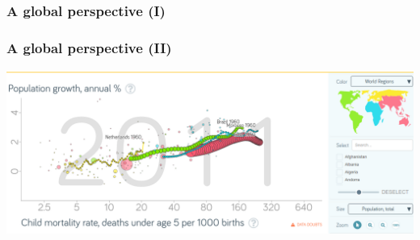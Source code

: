 \documentclass[
	12pt
	]{beamer}
\begin{document}
{%
\begin{frame}
\frametitle{A global perspective (I)}
\begingroup
\footnotesize %
	\begin{adjustbox}{max totalsize={\textwidth}{0.90\textheight}}
				
	\end{adjustbox}
\endgroup
\end{frame}
}


{%
\begin{frame}
\frametitle{A global perspective (II)}
	\includegraphics[width=1.1\textwidth, keepaspectratio]{figs/pop_mort.png}
\end{frame}
}
\end{document}
